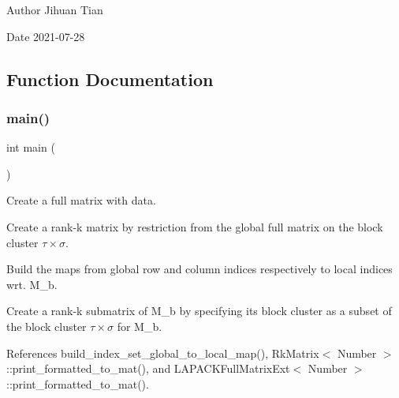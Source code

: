 \begin{DoxyAuthor}{Author}
Jihuan Tian 
\end{DoxyAuthor}
\begin{DoxyDate}{Date}
2021-\/07-\/28 
\end{DoxyDate}


\subsection{Function Documentation}
\mbox{\label{rkmatrix-local-to-rkmatrix_8cc_ae66f6b31b5ad750f1fe042a706a4e3d4}} 
\subsubsection{\texorpdfstring{main()}{main()}}
{\footnotesize\ttfamily int main (\begin{DoxyParamCaption}{ }\end{DoxyParamCaption})}

Create a full matrix with data.

Create a rank-\/k matrix by restriction from the global full matrix on the block cluster $\tau \times \sigma$.

Build the maps from global row and column indices respectively to local indices wrt. M\+\_\+b.

Create a rank-\/k submatrix of {\ttfamily M\+\_\+b} by specifying its block cluster as a subset of the block cluster $\tau \times \sigma$ for {\ttfamily M\+\_\+b}.

References build\+\_\+index\+\_\+set\+\_\+global\+\_\+to\+\_\+local\+\_\+map(), Rk\+Matrix$<$ Number $>$\+::print\+\_\+formatted\+\_\+to\+\_\+mat(), and L\+A\+P\+A\+C\+K\+Full\+Matrix\+Ext$<$ Number $>$\+::print\+\_\+formatted\+\_\+to\+\_\+mat().

